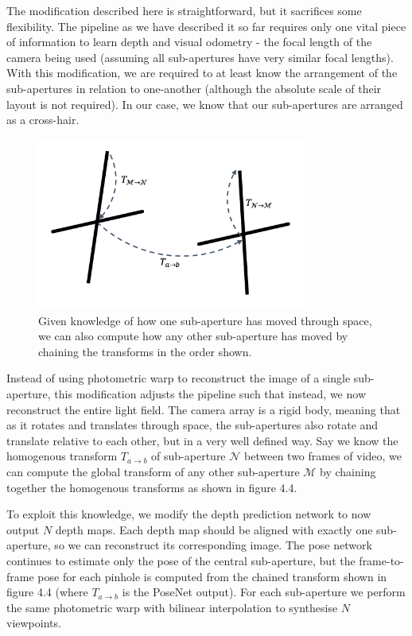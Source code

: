 The modification described here is straightforward, but it sacrifices some flexibility. The pipeline as we have described it so far requires only one vital piece of information to learn depth and visual odometry - the focal length of the camera being used (assuming all sub-apertures have very similar focal lengths). With this modification, we are required to at least know the arrangement of the sub-apertures in relation to one-another (although the absolute scale of their layout is not required). In our case, we know that our sub-apertures are arranged as a cross-hair. 

\begin{figure}[htbp]
    \centering 
    \includegraphics[width=3.5in]{images/relative_subapertures.png}
    \caption{Given knowledge of how one sub-aperture has moved through space, we can also compute how any other sub-aperture has moved by chaining the transforms in the order shown.}
\end{figure}

Instead of using photometric warp to reconstruct the image of a single sub-aperture, this modification adjusts the pipeline such that instead, we now reconstruct the entire light field. The camera array is a rigid body, meaning that as it rotates and translates through space, the sub-apertures also rotate and translate relative to each other, but in a very well defined way. Say we know the homogenous transform  $T_{a \rightarrow b}$ of sub-aperture $\mathcal{N}$ between two frames of video, we can compute the global transform of any other sub-aperture $\mathcal{M}$ by chaining together the homogenous transforms as shown in figure 4.4.

To exploit this knowledge, we modify the depth prediction network to now output $N$ depth maps. Each depth map should be aligned with exactly one sub-aperture, so we can reconstruct its corresponding image. The pose network continues to estimate only the pose of the central sub-aperture, but the frame-to-frame pose for each pinhole is computed from the chained transform shown in figure 4.4 (where $T_{a\rightarrow b}$ is the PoseNet output). For each sub-aperture we perform the same photometric warp with bilinear interpolation to synthesise $N$ viewpoints.

